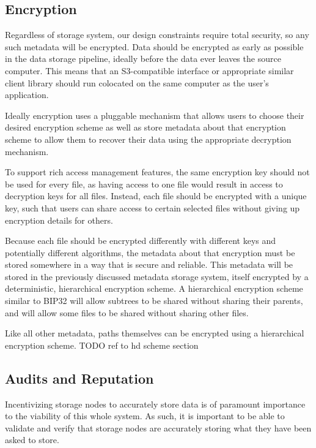 \documentclass[a4paper,10pt]{article} \usepackage[utf8]{inputenc}
\newcommand{\todo}[1]{{\color{red} TODO #1 }}
\begin{document}
\subsection{Encryption}

Regardless of storage system, our design constraints require total security,
so any such metadata will be encrypted.
Data should be encrypted as early as possible in the data storage pipeline,
ideally before the data ever leaves the source computer. This means that an
S3-compatible interface or appropriate similar client library should run
colocated on the same computer as the user's application.

Ideally encryption uses a pluggable mechanism that allows users to choose their
desired encryption scheme as well as store metadata about that encryption
scheme to allow them to recover their data using the appropriate decryption
mechanism.

To support rich access management features, the same encryption key should not
be used for every file, as having access to one file would result in access
to decryption keys for all files. Instead, each file should be encrypted with
a unique key, such that users can share access to certain selected files
without giving up encryption details for others.

Because each file should be encrypted differently with different keys and
potentially different algorithms, the metadata about that encryption must
be stored somewhere in a way that is secure and reliable. This metadata will
be stored in the previously discussed metadata storage system, itself encrypted
by a deterministic, hierarchical encryption scheme.
A hierarchical encryption scheme similar to
BIP32 \cite{bip32} will allow subtrees to be shared without sharing their
parents, and will allow some files to be shared without sharing other files.

Like all other metadata, paths themselves can be encrypted using a hierarchical
encryption scheme. \todo{ref to hd scheme section}

\subsection{Audits and Reputation}

Incentivizing storage nodes to accurately store data is of paramount importance
to
the viability of this whole system. As such, it is important to be able to
validate and verify that storage nodes are accurately storing what they have
been
asked to store.
\end{document}
